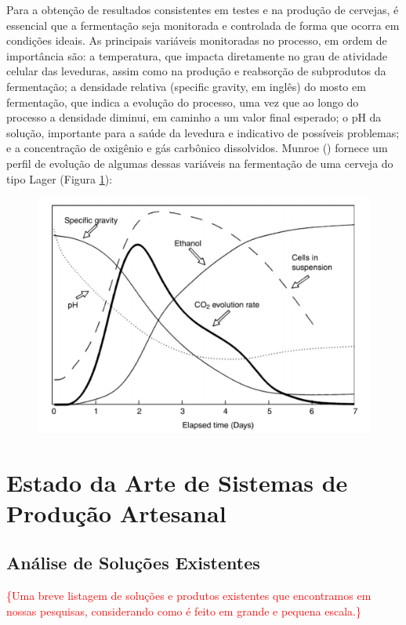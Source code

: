 Para a obtenção de resultados consistentes em testes e na produção de cervejas, é
essencial que a fermentação seja monitorada e controlada de forma que ocorra em
condições ideais. As principais variáveis monitoradas no processo, em ordem de
importância são: a temperatura, que impacta diretamente no grau de atividade
celular das leveduras, assim como na produção e reabsorção de subprodutos da
fermentação; a densidade relativa (specific gravity, em inglês) do mosto em
fermentação, que indica a evolução do processo, uma vez que ao longo do processo
a densidade diminui, em caminho a um valor final esperado; o pH da solução,
importante para a saúde da levedura e indicativo de possíveis problemas; e a
concentração de oxigênio e gás carbônico dissolvidos. Munroe () fornece um
perfil de evolução de algumas dessas variáveis na fermentação de uma cerveja do
tipo Lager (Figura \ref{fig:variaveis_fermentacao}):

\begin{figure}[H]
    \centering
    \includegraphics[scale=0.40]{figuras/contexto/variaveis_fermentacao.PNG}
    \label{fig:variaveis_fermentacao}
\end{figure}

\section{Estado da Arte de Sistemas de Produção Artesanal}

\subsection{Análise de Soluções Existentes}

\textcolor{red}{\{Uma breve listagem de soluções e produtos existentes que encontramos em nossas pesquisas, considerando como é feito em grande e pequena escala.\}}
